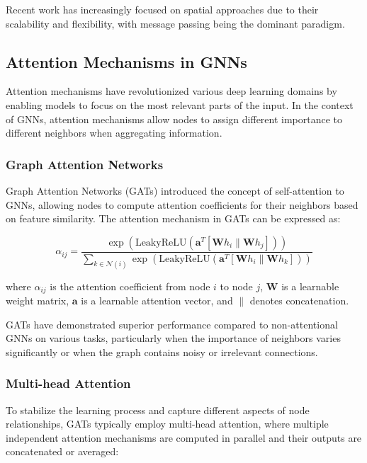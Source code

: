 \documentclass{article}
\begin{document}
Recent work has increasingly focused on spatial approaches due to their scalability and flexibility, with message passing being the dominant paradigm.

\subsection{Attention Mechanisms in GNNs}

Attention mechanisms have revolutionized various deep learning domains by enabling models to focus on the most relevant parts of the input. In the context of GNNs, attention mechanisms allow nodes to assign different importance to different neighbors when aggregating information.

\subsubsection{Graph Attention Networks}

Graph Attention Networks (GATs) \cite{velivckovic2018graph} introduced the concept of self-attention to GNNs, allowing nodes to compute attention coefficients for their neighbors based on feature similarity. The attention mechanism in GATs can be expressed as:

\begin{equation}
\alpha_{ij} = \frac{\exp\left(\text{LeakyReLU}\left(\mathbf{a}^T[\mathbf{W}h_i \| \mathbf{W}h_j]\right)\right)}{\sum_{k \in \mathcal{N}(i)} \exp\left(\text{LeakyReLU}\left(\mathbf{a}^T[\mathbf{W}h_i \| \mathbf{W}h_k]\right)\right)}
\end{equation}

where $\alpha_{ij}$ is the attention coefficient from node $i$ to node $j$, $\mathbf{W}$ is a learnable weight matrix, $\mathbf{a}$ is a learnable attention vector, and $\|$ denotes concatenation.

GATs have demonstrated superior performance compared to non-attentional GNNs on various tasks, particularly when the importance of neighbors varies significantly or when the graph contains noisy or irrelevant connections.

\subsubsection{Multi-head Attention}

To stabilize the learning process and capture different aspects of node relationships, GATs typically employ multi-head attention, where multiple independent attention mechanisms are computed in parallel and their outputs are concatenated or averaged:
\end{document}
